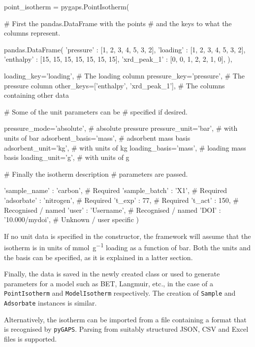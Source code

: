 \begin{python}[float=htbp, caption=Creating the \texttt{PointIsotherm},
    label={pyg:lst:isocreation}]
point_isotherm = pygaps.PointIsotherm(

    # First the pandas.DataFrame with the points
    # and the keys to what the columns represent.

    pandas.DataFrame({
        'pressure' : [1, 2, 3, 4, 5, 3, 2],
        'loading' : [1, 2, 3, 4, 5, 3, 2],
        'enthalpy' : [15, 15, 15, 15, 15, 15, 15],
        'xrd_peak_1' : [0, 0, 1, 2, 2, 1, 0],
    }),

    loading_key='loading',          # The loading column
    pressure_key='pressure',        # The pressure column
    other_keys=['enthalpy',
                'xrd_peak_1'],      # The columns containing other data

    # Some of the unit parameters can be 
    # specified if desired.

    pressure_mode='absolute',       # absolute pressure
    pressure_unit='bar',            # with units of bar
    adsorbent_basis='mass',         # adsorbent mass basis
    adsorbent_unit='kg',            # with units of kg
    loading_basis='mass',           # loading mass basis
    loading_unit='g',               # with units of g

    # Finally the isotherm description
    # parameters are passed.

    'sample_name' : 'carbon',       # Required
    'sample_batch' : 'X1',          # Required
    'adsorbate' : 'nitrogen',       # Required
    't_exp' : 77,                   # Required
    't_act' : 150,                  # Recognised / named
    'user'  : 'Username',           # Recognised / named
    'DOI'   : '10.000/mydoi',       # Unknown / user specific
)
\end{python}

If no unit data is specified in the constructor, the framework will
assume that the isotherm is in units of \si{\milli\mole\per\gram} 
loading as a function of \si{\bar}. Both the units and the basis 
can be specified, as it is explained in a latter section.

Finally, the data is saved in the newly created class or used to
generate parameters for a model such as BET, Langmuir, etc.,
in the case of a \texttt{PointIsotherm} and
\texttt{ModelIsotherm} respectively. The creation of
\texttt{Sample} and \texttt{Adsorbate} instances is similar.

Alternatively, the isotherm can be imported from a file containing 
a format that is recognised by \texttt{pyGAPS}. Parsing from 
suitably structured JSON, CSV and Excel files is supported.

